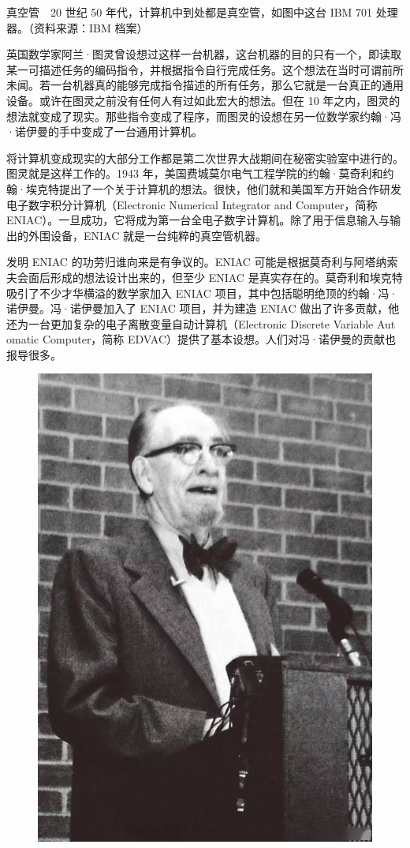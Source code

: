\documentclass[12pt,UTF8]{ctexbook}
\begin{document}
真空管　20 世纪 50 年代，计算机中到处都是真空管，如图中这台 IBM 701 处理器。（资料来源：IBM 档案）

英国数学家阿兰·图灵曾设想过这样一台机器，这台机器的目的只有一个，即读取某一可描述任务的编码指令，并根据指令自行完成任务。这个想法在当时可谓前所未闻。若一台机器真的能够完成指令描述的所有任务，那么它就是一台真正的通用设备。或许在图灵之前没有任何人有过如此宏大的想法。但在 10 年之内，图灵的想法就变成了现实。那些指令变成了程序，而图灵的设想在另一位数学家约翰·冯·诺伊曼的手中变成了一台通用计算机。

将计算机变成现实的大部分工作都是第二次世界大战期间在秘密实验室中进行的。图灵就是这样工作的。1943 年，美国费城莫尔电气工程学院的约翰·莫奇利和约翰·埃克特提出了一个关于计算机的想法。很快，他们就和美国军方开始合作研发电子数字积分计算机（Electronic Numerical Integrator and Computer，简称 ENIAC）。一旦成功，它将成为第一台全电子数字计算机。除了用于信息输入与输出的外围设备，ENIAC 就是一台纯粹的真空管机器。

发明 ENIAC 的功劳归谁向来是有争议的。ENIAC 可能是根据莫奇利与阿塔纳索夫会面后形成的想法设计出来的，但至少 ENIAC 是真实存在的。莫奇利和埃克特吸引了不少才华横溢的数学家加入 ENIAC 项目，其中包括聪明绝顶的约翰·冯·诺伊曼。冯·诺伊曼加入了 ENIAC 项目，并为建造 ENIAC 做出了许多贡献，他还为一台更加复杂的电子离散变量自动计算机（Electronic Discrete Variable Aut omatic Computer，简称 EDVAC）提供了基本设想。人们对冯·诺伊曼的贡献也报导很多。

\begin{figure}[htbp]
	\centering
	\includegraphics[width=0.7\linewidth]{7}
	\caption{}
	\label{fig:1}
\end{figure}
\end{document}
